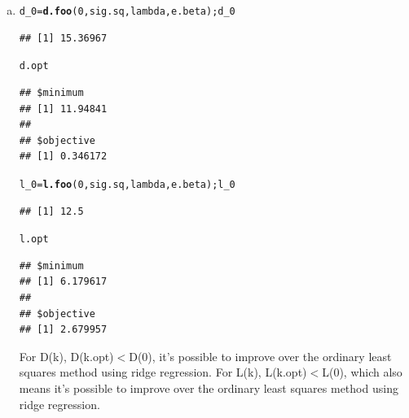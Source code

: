 \documentclass{article}\usepackage[]{graphicx}\usepackage[]{color}
\makeatletter
\newcommand{\hlnum}[1]{\textcolor[rgb]{0.686,0.059,0.569}{#1}}%
\newcommand{\hlstd}[1]{\textcolor[rgb]{0.345,0.345,0.345}{#1}}%
\newcommand{\hlkwb}[1]{\textcolor[rgb]{0.69,0.353,0.396}{#1}}%
\newcommand{\hlkwd}[1]{\textcolor[rgb]{0.737,0.353,0.396}{\textbf{#1}}}%
\newenvironment{kframe}{%
 \def\at@end@of@kframe{}%
 \ifinner\ifhmode%
  \def\at@end@of@kframe{\end{minipage}}%
  \begin{minipage}{\columnwidth}%
 \fi\fi%
 \def\FrameCommand##1{\hskip\@totalleftmargin \hskip-\fboxsep
 \colorbox{shadecolor}{##1}\hskip-\fboxsep
     \hskip-\linewidth \hskip-\@totalleftmargin \hskip\columnwidth}%
 \MakeFramed {\advance\hsize-\width
   \@totalleftmargin\z@ \linewidth\hsize
   \@setminipage}}%
 {\par\unskip\endMakeFramed%
 \at@end@of@kframe}
\newenvironment{knitrout}{}{} %
\makeatother
\begin{document}
\begin{enumerate}[(a)]
\item

\begin{knitrout}
\color{fgcolor}\begin{kframe}
\begin{alltt}
  \hlstd{d_0} \hlkwb{=} \hlkwd{d.foo}\hlstd{(}\hlnum{0}\hlstd{, sig.sq, lambda, e.beta); d_0}
\end{alltt}
\begin{verbatim}
## [1] 15.36967
\end{verbatim}
\begin{alltt}
  \hlstd{d.opt}
\end{alltt}
\begin{verbatim}
## $minimum
## [1] 11.94841
## 
## $objective
## [1] 0.346172
\end{verbatim}
\begin{alltt}
  \hlstd{l_0} \hlkwb{=} \hlkwd{l.foo}\hlstd{(}\hlnum{0}\hlstd{, sig.sq, lambda, e.beta); l_0}
\end{alltt}
\begin{verbatim}
## [1] 12.5
\end{verbatim}
\begin{alltt}
  \hlstd{l.opt}
\end{alltt}
\begin{verbatim}
## $minimum
## [1] 6.179617
## 
## $objective
## [1] 2.679957
\end{verbatim}
\end{kframe}
\end{knitrout}

\qquad For D(k), D(k.opt)$<$D(0), it's possible to improve over the ordinary least squares method using ridge regression.
For L(k), L(k.opt)$<$L(0), which also means it's possible to improve over the ordinary least squares method using ridge regression.

\end{enumerate}
\end{document}
